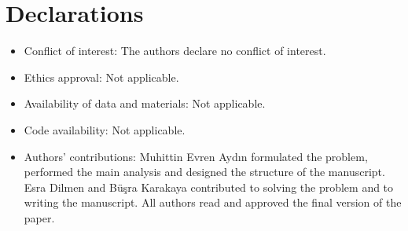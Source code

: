 \documentclass[12pt,reqno]{amsart}
\theoremstyle{definition}
\begin{document}
\section*{Declarations}

\begin{itemize}
\item Conflict of interest: The authors declare no conflict of interest.

\item Ethics approval: Not applicable.

\item Availability of data and materials: Not applicable.

\item Code availability: Not applicable.

\item Authors’ contributions: Muhittin Evren Aydın formulated the problem, performed the main analysis and designed the structure of the manuscript. Esra Dilmen and Büşra Karakaya contributed to solving the problem and to writing the manuscript. All authors read and approved the final version of the paper.
\end{itemize}
\end{document}

